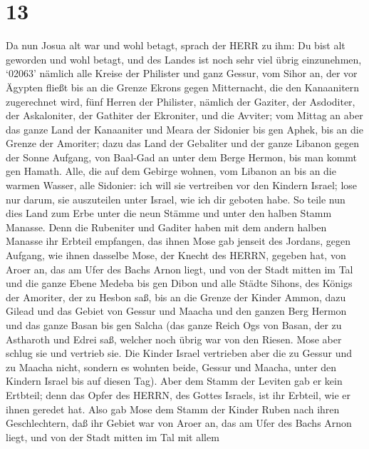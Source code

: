 \hypertarget{section-12}{%
\section{13}\label{section-12}}

 Da nun Josua alt war und wohl betagt, sprach der HERR zu
ihm: Du bist alt geworden und wohl betagt, und des Landes ist noch sehr
viel übrig einzunehmen,  `02063' nämlich alle Kreise der
Philister und ganz Gessur,  vom Sihor an, der vor Ägypten
fließt bis an die Grenze Ekrons gegen Mitternacht, die den Kanaanitern
zugerechnet wird, fünf Herren der Philister, nämlich der Gaziter, der
Asdoditer, der Askaloniter, der Gathiter der Ekroniter, und die Avviter;
 vom Mittag an aber das ganze Land der Kanaaniter und Meara
der Sidonier bis gen Aphek, bis an die Grenze der Amoriter; 
dazu das Land der Gebaliter und der ganze Libanon gegen der Sonne
Aufgang, von Baal-Gad an unter dem Berge Hermon, bis man kommt gen
Hamath.  Alle, die auf dem Gebirge wohnen, vom Libanon an
bis an die warmen Wasser, alle Sidonier: ich will sie vertreiben vor den
Kindern Israel; lose nur darum, sie auszuteilen unter Israel, wie ich
dir geboten habe.  So teile nun dies Land zum Erbe unter die
neun Stämme und unter den halben Stamm Manasse.  Denn die
Rubeniter und Gaditer haben mit dem andern halben Manasse ihr Erbteil
empfangen, das ihnen Mose gab jenseit des Jordans, gegen Aufgang, wie
ihnen dasselbe Mose, der Knecht des HERRN, gegeben hat,  von
Aroer an, das am Ufer des Bachs Arnon liegt, und von der Stadt mitten im
Tal und die ganze Ebene Medeba bis gen Dibon  und alle
Städte Sihons, des Königs der Amoriter, der zu Hesbon saß, bis an die
Grenze der Kinder Ammon,  dazu Gilead und das Gebiet von
Gessur und Maacha und den ganzen Berg Hermon und das ganze Basan bis gen
Salcha  (das ganze Reich Ogs von Basan, der zu Astharoth
und Edrei saß, welcher noch übrig war von den Riesen. Mose aber schlug
sie und vertrieb sie.  Die Kinder Israel vertrieben aber
die zu Gessur und zu Maacha nicht, sondern es wohnten beide, Gessur und
Maacha, unter den Kindern Israel bis auf diesen Tag).  Aber
dem Stamm der Leviten gab er kein Ertbteil; denn das Opfer des HERRN,
des Gottes Israels, ist ihr Erbteil, wie er ihnen geredet hat.
 Also gab Mose dem Stamm der Kinder Ruben nach ihren
Geschlechtern,  daß ihr Gebiet war von Aroer an, das am
Ufer des Bachs Arnon liegt, und von der Stadt mitten im Tal mit allem
